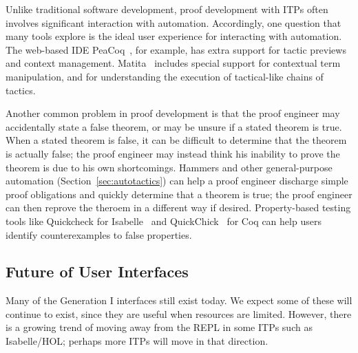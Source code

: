 Unlike traditional software development, proof development with ITPs
often involves significant interaction with automation. Accordingly, one question that many tools
explore is the ideal user experience for interacting with automation.
The web-based IDE PeaCoq~\citep{peacoq}, for example, has extra support for tactic previews and context management.
Matita~\citep{asperti2007user} includes special support for contextual term manipulation,
and for understanding the execution of tactical-like chains of tactics.

Another common problem in proof development is that the proof engineer may accidentally
state a false theorem, or may be unsure if a stated theorem is true.
When a stated theorem is false, it can be difficult to determine that the theorem is actually false;
the proof engineer may instead think his inability to prove the theorem is due to his own shortcomings.
Hammers and other general-purpose automation (Section~\ref{sec:autotactics}) can help a proof engineer discharge simple proof obligations
and quickly determine that a theorem is true; the proof engineer can then reprove the theroem in a different way if desired.
Property-based testing tools like Quickcheck for Isabelle~\citep{Bulwahn2012b} and QuickChick~\citep{lampropoulos2017generating, Paraskevopoulou2015} 
for Coq can help users identify counterexamples to false properties.



\subsection{Future of User Interfaces}
\label{sec:futureinterface}

Many of the Generation I interfaces
still exist today. We expect some of these will continue to exist, since they are
useful when resources are limited. However, there is a growing trend of moving away from the REPL in some ITPs
such as Isabelle/HOL; perhaps more ITPs will move in that direction.

